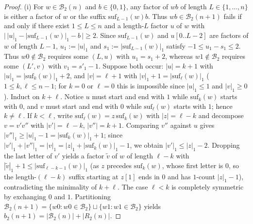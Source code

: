 \documentclass[11pt,a4paper]{article}
\theoremstyle{definition}
\begin{document}
\begin{proof}
(i) For $w \in \mathcal{B}_2(n)$ and $b \in \{0, 1\}$, any factor of $wb$ of length $L \in \{1, \dots, n\}$ is either a factor of $w$ or the suffix $\mathrm{suf}_{L-1}(w)b$. Thus $wb \in \mathcal{B}_2(n+1)$ fails if and only if there exist $1 \le L \le n$ and a length-$L$ factor $u$ of $w$ with $\bigl|\,|u|_1 - |\mathrm{suf}_{L-1}(w)|_1 - b\,\bigr| \ge 2$. Since $\mathrm{suf}_{L-1}(w)$ and $u[0..L-2]$ are factors of $w$ of length $L - 1$, $u_1 := |u|_1$ and $s_1 := |\mathrm{suf}_{L-1}(w)|_1$ satisfy $-1 \le u_1 - s_1 \le 2$. Thus $w0 \notin \mathcal{B}_2$ requires some $(L, u)$ with $u_1 = s_1 + 2$, whereas $w1 \notin \mathcal{B}_2$ requires some $(L', v)$ with $v_1 = s'_1 - 1$. Suppose both occur: $|u| = k + 1$ with $|u|_1 = |\mathrm{suf}_k(w)|_1 + 2$, and $|v| = \ell + 1$ with $|v|_1 + 1 = |\mathrm{suf}_\ell(w)|_1$ ($1 \le k, \ell \le n - 1$; for $k = 0$ or $\ell = 0$ this is impossible since $|u|_1 \le 1$ and $|v|_1 \ge 0$). Induct on $k + \ell$. Notice $u$ must start and end with $1$ while $\mathrm{suf}_k(w)$ starts with $0$, and $v$ must start and end with $0$ while $\mathrm{suf}_\ell(w)$ starts with $1$; hence $k \neq \ell$. If $k < \ell$, write $\mathrm{suf}_\ell(w) = z\,\mathrm{suf}_k(w)$ with $|z| = \ell - k$ and decompose $v = v' v''$ with $|v'| = \ell - k$, $|v''| = k + 1$. Comparing $v''$ against $u$ gives $|v''|_1 \ge |u|_1 - 1 = |\mathrm{suf}_k(w)|_1 + 1$; since $|v'|_1 + |v''|_1 = |v|_1 = |z|_1 + |\mathrm{suf}_k(w)|_1 - 1$, we obtain $|v'|_1 \le |z|_1 - 2$. Dropping the last letter of $v'$ yields a factor $\tilde{v}$ of $w$ of length $\ell - k$ with $|\tilde{v}|_1 + 1 \le |\mathrm{suf}_{\ell - k - 1}(w)|_1$ (as $z$ precedes $\mathrm{suf}_k(w)$, whose first letter is $0$, so the length-$(\ell-k)$ suffix starting at $z[1]$ ends in $0$ and has $1$-count $|z|_1 - 1$), contradicting the minimality of $k + \ell$. The case $\ell < k$ is completely symmetric by exchanging $0$ and $1$. Partitioning $\mathcal{B}_2(n+1) = \{w0 : w0 \in \mathcal{B}_2\} \sqcup \{w1 : w1 \in \mathcal{B}_2\}$ yields $b_2(n+1) = |\mathcal{B}_2(n)| + |R_2(n)|$.


\end{proof}
\end{document}
